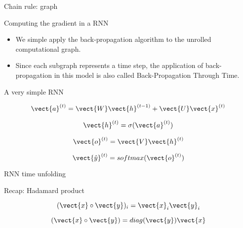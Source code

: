 \documentclass[10pt]{beamer}
\begin{document}
\begin{frame}{Chain rule: graph}

\end{frame}

\begin{frame}{Computing the gradient in a RNN}
\begin{itemize}
\item We simple apply the back-propagation algorithm to the unrolled computational graph.

\vspace{0.5cm}

\item Since each subgraph represents a time step, the application of back-propagation in this model is also called \alert{Back-Propagation Through Time}.
\end{itemize}
\end{frame}


\begin{frame}{A very simple RNN}

\Large{
\begin{equation*}
\vect{a}^{(t)} = \vect{W} \vect{h}^{(t-1)} + \vect{U} \vect{x}^{(t)}
\end{equation*}

\vspace{0.1cm}

\begin{equation*}
\vect{h}^{(t)} = \sigma(\vect{a}^{(t)})
\end{equation*}

\vspace{0.1cm}

\begin{equation*}
\vect{o}^{(t)} = \vect{V} \vect{h}^{(t)}
\end{equation*}

\vspace{0.1cm}

\begin{equation*}
\vect{\hat{y}}^{(t)} = softmax(\vect{o}^{(t)})
\end{equation*}
}

\end{frame}


\begin{frame}{RNN time unfolding}

\end{frame}

\begin{frame}{Recap: Hadamard product}
\Large{
\begin{equation*}
(\vect{x} \circ \vect{y})_{i} = \vect{x}_{i} \vect{y}_{i} 
\end{equation*}

\vspace{0.5cm}

\begin{equation*}
(\vect{x} \circ \vect{y}) = diag(\vect{y})\vect{x} 
\end{equation*}
 }
\end{frame}
\end{document}
